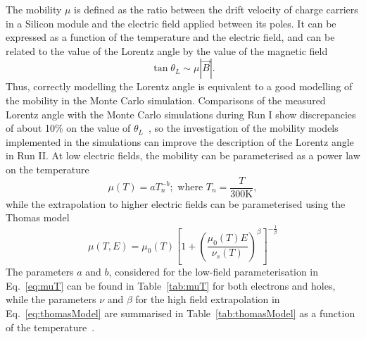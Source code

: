 The mobility $\mu$ is defined as the ratio between the drift velocity of charge carriers in a Silicon module and the electric field applied between its poles. It can be expressed as a function of the temperature and the electric field, and can be related to the value of the Lorentz angle by the value of the magnetic field
\begin{equation}
\tan\theta_L \sim \mu|\vec{B}|.
\label{eq:muTheta}
\end{equation}
Thus, correctly modelling the Lorentz angle is equivalent to a good modelling of the mobility in the Monte Carlo simulation. Comparisons of the measured Lorentz angle with the Monte Carlo simulations during Run I show discrepancies of about 10\% on the value of $\theta_L$~\cite{bib:muModels}, so the investigation of the mobility models implemented in the simulations can improve the description of the Lorentz angle in Run II. At low electric fields, the mobility can be parameterised as a power law on the temperature
\begin{equation}
\mu(T) = aT_n^{-b}; \mbox{  where  } T_n = \frac{T}{300\mbox{K}},
\label{eq:muT}
\end{equation}
while the extrapolation to higher electric fields can be parameterised using the Thomas model~\cite{bib:thomas}
\begin{equation}
\mu(T,E) = \mu_0(T)\left[1+\left(\frac{\mu_0(T) E}{\nu_s(T)}\right)^\beta\right]^{-\frac{1}{\beta}}
\label{eq:thomasModel}
\end{equation}
The parameters $a$ and $b$, considered for the low-field parameterisation in Eq.~\ref{eq:muT} can be found in Table~\ref{tab:muT} for both electrons and holes, while the parameters $\nu$ and $\beta$ for the high field extrapolation in Eq.~\ref{eq:thomasModel} are summarised in Table~\ref{tab:thomasModel} as a function of the temperature~\cite{bib:muModels}.
\clearpage

